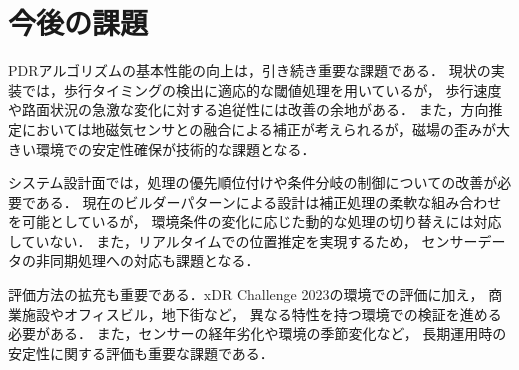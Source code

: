 \documentclass[a4paper, 10pt, twocolumn]{jarticle}
\begin{document}
\section{今後の課題}

PDRアルゴリズムの基本性能の向上は，引き続き重要な課題である．
現状の実装では，歩行タイミングの検出に適応的な閾値処理を用いているが，
歩行速度や路面状況の急激な変化に対する追従性には改善の余地がある．
また，方向推定においては地磁気センサとの融合による補正が考えられるが，磁場の歪みが大きい環境での安定性確保が技術的な課題となる．

システム設計面では，処理の優先順位付けや条件分岐の制御についての改善が必要である．
現在のビルダーパターンによる設計は補正処理の柔軟な組み合わせを可能としているが，
環境条件の変化に応じた動的な処理の切り替えには対応していない．
また，リアルタイムでの位置推定を実現するため，
センサーデータの非同期処理への対応も課題となる．

評価方法の拡充も重要である．xDR Challenge 2023の環境での評価に加え，
商業施設やオフィスビル，地下街など，
異なる特性を持つ環境での検証を進める必要がある．
また，センサーの経年劣化や環境の季節変化など，
長期運用時の安定性に関する評価も重要な課題である．





\end{document}
